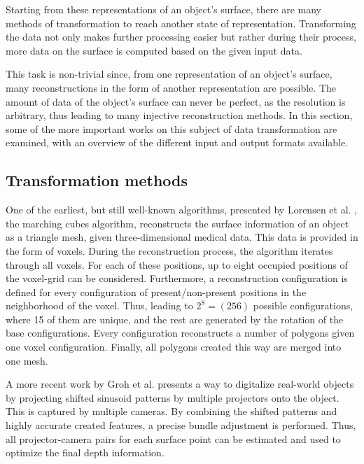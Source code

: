 Starting from these representations of an object's surface, there are many methods 
of transformation to reach another state of representation. 
Transforming the data not only makes further processing easier
 but rather during their process, more data on the surface is 
 computed based on the given input data.

 This task is non-trivial since, from one representation of an object's surface, many reconstructions in the form of another representation are possible. The amount of data of the object's surface can never be perfect, as the resolution is arbitrary, thus leading to many injective reconstruction methods.
 In this section, some of the more important works on this subject of data transformation are examined, with 
 an overview of the different input and output formats available. 

 \subsection{Transformation methods}

One of the earliest, but still well-known algorithms, presented by
 Lorensen et al. \cite{Lorensen:1987:MCH:37402.37422}, the marching cubes algorithm, reconstructs the surface information of an object as a
  triangle mesh, given three-dimensional medical data. This data is provided in the form of
   voxels. 
During the reconstruction process, the algorithm iterates through all voxels. For each of these positions, up to eight occupied positions of the voxel-grid can be considered. Furthermore, a reconstruction configuration is defined for every configuration of present/non-present positions in the neighborhood of the voxel. Thus, leading to $2^8 = (256)$ possible configurations, where 15 of them are unique, and the rest are generated by the rotation of the base configurations.  Every configuration reconstructs a number of polygons given one voxel configuration. Finally, all polygons created this way are merged into one mesh.
 
A more recent work by Groh et al.\cite{Groh2017} presents a way to digitalize real-world objects by projecting shifted sinusoid patterns by multiple projectors onto the object. This is captured by multiple cameras. By combining the shifted patterns and highly accurate created features, a precise bundle adjustment is performed. Thus, all projector-camera pairs for each surface point can be estimated and used to optimize the final depth information.

